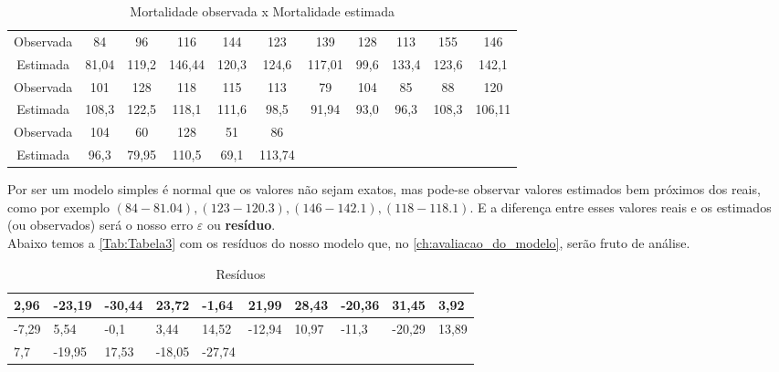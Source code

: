 \begin{table}[H]
\caption{Mortalidade observada x Mortalidade estimada}
\begin{tabular}{ccccccccccc}
\hline
Observada & 84 & 96 & 116 & 144 & 123 & 139 & 128 & 113 & 155 & 146 \\
Estimada & 81,04 & 119,2 & 146,44 & 120,3 & 124,6 & 117,01 & 99,6 & 133,4 & 123,6 & 142,1 \\ \hline
Observada & 101 & 128 & 118 & 115 & 113 & 79 & 104 & 85 & 88 & 120 \\
Estimada & 108,3 & 122,5 & 118,1 & 111,6 & 98,5 & 91,94 & 93,0 & 96,3 & 108,3 & 106,11 \\ \hline
Observada & 104 & 60 & 128 & 51 & 86 & \textbf{} & \textbf{} & \textbf{} & \textbf{} & \textbf{} \\
Estimada & 96,3 & 79,95 & 110,5 & 69,1 & 113,74 & \textbf{} & \textbf{} & \textbf{} & \textbf{} & \textbf{} \\ \hline
\end{tabular}%
\label{Tab: tabela2}
\end{table}

\noindent Por ser um modelo simples é normal que os valores não sejam exatos, mas pode-se observar valores estimados bem próximos dos reais, como por exemplo $ (84 - 81.04), (123 - 120.3), (146 -142.1), (118 - 118.1) $. E a diferença entre esses valores reais e os estimados (ou observados) será o nosso erro $\varepsilon$ ou \textbf{resíduo}.\\

\noindent Abaixo temos a \autoref{Tab:Tabela3} com os resíduos do nosso modelo que, no \autoref{ch:avaliacao_do_modelo}, serão fruto de análise.

\begin{table}[H]
\centering
\caption{Resíduos}
\begin{tabular}{llllllllll}
\hline
2,96 & -23,19 & -30,44 & 23,72 & -1,64 & 21,99 & 28,43 & -20,36 & 31,45 & 3,92 \\ \hline
-7,29 & 5,54 & -0,1 & 3,44 & 14,52 & -12,94 & 10,97 & -11,3 & -20,29 & 13,89 \\ \hline
7,7 & -19,95 & 17,53 & -18,05 & -27,74 & \textbf{} & \textbf{} & \textbf{} & \textbf{} & \textbf{} \\ \hline
\end{tabular}
\label{Tab:Tabela3}
\end{table}